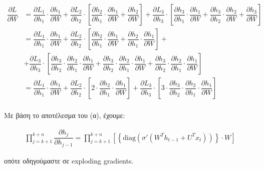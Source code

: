 \documentclass[12pt,a4paper]{article}
\begin{document}
				\begin{align*}
					\dfrac{\partial L}{\partial W} &= 
						\dfrac{\partial L_1}{\partial h_1} \cdot \dfrac{\partial h_1}{\partial W} 
						+ \dfrac{\partial L_2}{\partial h_2} \cdot \left[ 
							\dfrac{\partial h_2}{\partial h_1} \cdot \dfrac{\partial h_1}{\partial W} 
							+ \dfrac{\partial h_2}{\partial W} 
						\right] 
						+ \dfrac{\partial L_3}{\partial h_3} \cdot \left[
							\dfrac{\partial h_3}{\partial h_1} \cdot \dfrac{\partial h_1}{\partial W} 
							+ \dfrac{\partial h_3}{\partial h_2} \cdot \dfrac{\partial h_2}{\partial W} 
							+ \dfrac{\partial h_3}{\partial W}
						\right] \\ &= 
					\dfrac{\partial L_1}{\partial h_1} \cdot \dfrac{\partial h_1}{\partial W} 
					+ \dfrac{\partial L_2}{\partial h_2} \cdot \left[
						\dfrac{\partial h_2}{\partial h_1} \cdot \dfrac{\partial h_1}{\partial W} 
						+ \dfrac{\partial h_2}{\partial h_1} \cdot \dfrac{\partial h_1}{\partial W}
					\right] + \\
					&+ \dfrac{\partial L_3}{\partial h_3} \cdot \left[
						\dfrac{\partial h_3}{\partial h_2} \cdot \dfrac{\partial h_2}{\partial h_1} \cdot \dfrac{\partial h_1}{\partial W} 
						+ \dfrac{\partial h_3}{\partial h_2} \cdot \dfrac{\partial h_2}{\partial h_1} \cdot \dfrac{\partial h_1}{\partial W} 
						+ \dfrac{\partial h_3}{\partial h_2} \cdot \dfrac{\partial h_2}{\partial h_1} \cdot \dfrac{\partial h_1}{\partial W}
					\right] \\ &= 
					\dfrac{\partial L_1}{\partial h_1} \cdot \dfrac{\partial h_1}{\partial W} 
					+ \dfrac{\partial L_2}{\partial h_2} \cdot \left[
						2 \cdot \dfrac{\partial h_2}{\partial h_1} \cdot \dfrac{\partial h_1}{\partial W}
					\right] 
					+ \dfrac{\partial L_3}{\partial h_3} \cdot \left[
						3 \cdot \dfrac{\partial h_3}{\partial h_2} \cdot \dfrac{\partial h_2}{\partial h_1} \cdot \dfrac{\partial h_1}{\partial W}
					\right] \\
				\end{align*}
				
			Με βάση το αποτέλεσμα του (α), έχουμε:
			
			\begin{align*}
				\prod_{j=k+1}^{k+n} \dfrac{\partial h_j}{\partial h_{j-1}} = \prod_{j=k+1}^{k+n} \left[\left\{\text{diag}(\sigma'(W^Th_{t-1} + U^Tx_t))\right\} \cdot W\right]
			\end{align*}
			
			οπότε οδηγούμαστε σε exploding gradients.
		
\end{document}
